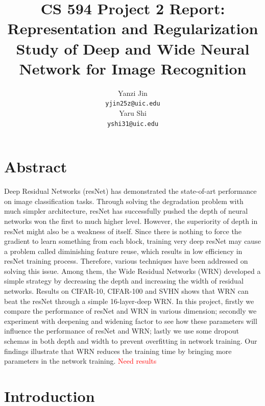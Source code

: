 \documentclass{article} %
\title{CS 594 Project 2 Report: Representation and Regularization Study of Deep and Wide Neural Network for Image Recognition}
\author{
Yanzi Jin \\
\texttt{yjin25z@uic.edu} \\
\And
Yaru Shi \\
\texttt{yshi31@uic.edu} \\
}
\begin{document}
\maketitle
\section{Abstract}
Deep Residual Networks (resNet) has demonstrated the state-of-art performance on image classification tasks. Through solving the degradation problem with much simpler architecture, resNet has successfully pushed the depth of neural networks won the first to much higher level. However, the superiority of depth in resNet might also be a weakness of itself. Since there is nothing to force the gradient to learn something from each block, training very deep resNet may cause a problem called diminishing feature reuse, which results in low efficiency in resNet training process. Therefore, various techniques have been addressed on solving this issue. Among them, the Wide Residual Networks (WRN) developed a simple strategy by decreasing the depth and increasing the width of residual networks. Results on CIFAR-10, CIFAR-100 and SVHN shows that WRN can beat the resNet through a simple 16-layer-deep WRN. In this project, firstly we compare the performance of resNet and WRN in various dimension; secondly we experiment with deepening and widening factor to see how these parameters will influence the performance of resNet and WRN; lastly we use some dropout schemas in both depth and width to prevent overfitting in network training. Our findings illustrate that WRN reduces the training time by bringing more parameters in the network training.  \textcolor{red}{Need results}

\section{Introduction}
\end{document}
